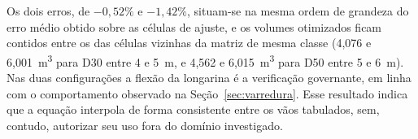 Os dois erros, de $-0{,}52\%$ e $-1{,}42\%$, situam-se na mesma ordem de grandeza do erro médio obtido sobre as células de ajuste, e os volumes otimizados ficam contidos entre os das células vizinhas da matriz de mesma classe (4{,}076 e 6{,}001~m\textsuperscript{3} para D30 entre 4 e 5~m, e 4{,}562 e 6{,}015~m\textsuperscript{3} para D50 entre 5 e 6~m).
Nas duas configurações a flexão da longarina é a verificação governante, em linha com o comportamento observado na Seção~\ref{sec:varredura}.
Esse resultado indica que a equação interpola de forma consistente entre os vãos tabulados, sem, contudo, autorizar seu uso fora do domínio investigado.